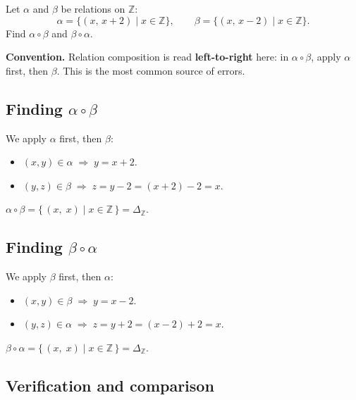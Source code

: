 \documentclass[12pt, a4paper]{article}
\newcommand{\Z}{\mathbb{Z}}
\begin{document}
\begin{problembox}
Let $\alpha$ and $\beta$ be relations on $\Z$:
\[
  \alpha = \{(x,\, x+2) \mid x \in \Z\}, \qquad
  \beta  = \{(x,\, x-2) \mid x \in \Z\}.
\]
Find $\alpha \circ \beta$ and $\beta \circ \alpha$.
\end{problembox}

\textbf{Convention.}\; Relation composition is read \textbf{left-to-right} here: in $\alpha \circ \beta$, apply $\alpha$ first, then $\beta$. This is the most common source of errors.

\medskip

\subsection*{Finding $\alpha \circ \beta$}

We apply $\alpha$ first, then $\beta$:
\begin{itemize}[nosep]
  \item $(x, y) \in \alpha \;\Longrightarrow\; y = x + 2$.
  \item $(y, z) \in \beta  \;\Longrightarrow\; z = y - 2 = (x+2)-2 = x$.
\end{itemize}

\begin{answerbox}
$\alpha \circ \beta = \{\,(x,\; x) \mid x \in \Z\,\} = \Delta_{\Z}.$
\end{answerbox}

\subsection*{Finding $\beta \circ \alpha$}

We apply $\beta$ first, then $\alpha$:
\begin{itemize}[nosep]
  \item $(x, y) \in \beta  \;\Longrightarrow\; y = x - 2$.
  \item $(y, z) \in \alpha \;\Longrightarrow\; z = y + 2 = (x-2)+2 = x$.
\end{itemize}

\begin{answerbox}
$\beta \circ \alpha = \{\,(x,\; x) \mid x \in \Z\,\} = \Delta_{\Z}.$
\end{answerbox}

\subsection*{Verification and comparison}
\end{document}
